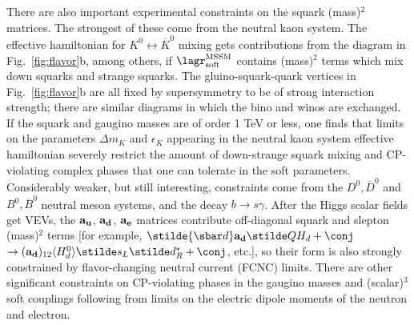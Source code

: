 There are also important
experimental constraints on the squark (mass)$^2$ matrices.
The strongest of these come from the neutral kaon system. The
effective hamiltonian for $K^0\leftrightarrow \overline K^0$
mixing gets
contributions from the diagram in
Fig.~\ref{fig:flavor}b, among others, if $\lagr_{\rm soft}^{\rm MSSM}$
contains (mass)$^2$ terms
which mix down squarks and strange squarks.
The gluino-squark-quark vertices in Fig.~\ref{fig:flavor}b are all
fixed by supersymmetry to be of strong interaction strength; there
are similar diagrams in which the bino and winos are
exchanged.\cite{mixwinoex}
If the squark and gaugino masses are of order 1 TeV or less,
one finds that limits on the parameters $\Delta m_K$ and $\epsilon_K$
appearing in the neutral kaon system effective hamiltonian severely
restrict the amount of down-strange squark mixing and
CP-violating complex phases that one can
tolerate in the soft parameters.\cite{morestuff} Considerably weaker, but
still
interesting, constraints come from the
$D^0,
\overline D^0$
and
$B^0,
\overline B^0$
neutral meson systems, and the decay $b\rightarrow s\gamma$.\cite{bsgamma}
 After the
Higgs scalar fields get VEVs, the
$\bf a_u$,
$\bf a_d$,
$\bf a_e$ matrices contribute off-diagonal squark and slepton (mass)$^2$
terms [for example, ${\stilde{\sbar d}} {\bf a_d}
{\stilde Q} H_d + \conj$ $\rightarrow
({\bf a_d})_{12} \langle H_d^0 \rangle \stilde s_L \stilde d_R^* + \conj$,
etc.],
so
their form is also strongly constrained by
flavor-changing neutral current (FCNC) limits.
There are other significant constraints on CP-violating phases in the
gaugino masses and (scalar)$^3$ soft couplings following from
limits on the electric dipole moments of the neutron and
electron.\cite{demon}

